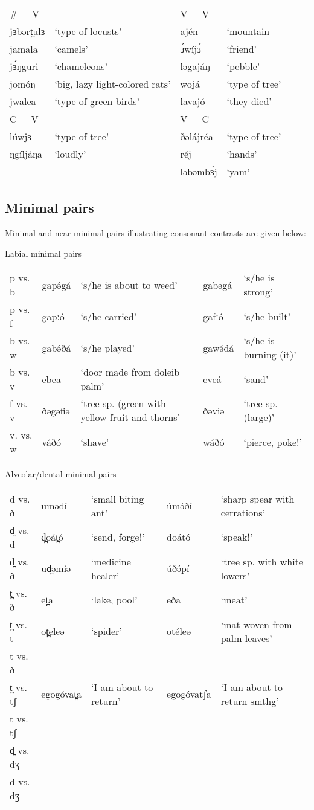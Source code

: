 \ea 
\begin{tabular}[t]{lp{3cm}lp{3cm}}
\#\_\_V	&&	V\_\_V		\\
jɜbərt̪ulɜ	&‘type of locusts’	&ajén	&‘mountain\\
jamala		&‘camels’			&ɜ́wíjɜ́	&‘friend’\\
jɜ́ŋguri		&‘chameleons’		&ləgajáŋ	&‘pebble’\\
jomóŋ		&‘big, lazy light-colored rats’		&wojá	&‘type of tree’\\
jwalea 		&‘type of green birds’		&lavajó	&‘they died’\\
\midrule
C\_\_V	&&		V\_\_C	\\
\midrule
lúwjɜ		&‘type of tree’		&ðəlájréa	&‘type of tree’\\
ŋgíljáŋa	&‘loudly’		&réj				&‘hands’\\
							&&ləbəmbɜ́j		&‘yam’
\end{tabular}\label{ex:ch2:42}	
\z



\subsection{Minimal pairs}
Minimal and near minimal pairs illustrating consonant contrasts are given below:

\ea Labial minimal pairs
\begin{tabular}[t]{llp{3cm}ll}
p vs. b	& gapə́gá		&‘s/he is about to weed’			&gabəgá	&‘s/he is strong’\\
p vs. f	&gapːó		&‘s/he carried’					&gafːó	&‘s/he built’\\
b vs. w	&gabə́ðá		&‘s/he played’					&gawə́dá	&‘s/he is burning (it)’\\
b vs. v	&ebea		&‘door made from doleib palm’	&eveá	&‘sand’\\
f vs. v	&ðəgəfiə	&‘tree sp. (green with yellow fruit and thorns’	&ðəviə	&‘tree sp. (large)’\\
v. vs. w	&váðó	&‘shave’							&wáðó	&‘pierce, poke!’
\end{tabular}\label{ex:ch2:43}
\z 


\ea Alveolar/dental minimal pairs
\begin{tabular}[t]{llp{3cm}lp{3cm}}
d vs. ð	&umədí	&‘small biting ant’	&úmə́ðí	&‘sharp spear with cerrations’\\
d̪ vs. d	&d̪oát̪ó	&‘send, forge!’		&doátó	&‘speak!’\\
d̪ vs. ð	&ud̪əmiə	&‘medicine healer’	&úðə́pí	&‘tree sp. with white lowers’\\
t̪ vs. ð	&et̪a	&‘lake, pool’		&eða		&‘meat’\\
t̪ vs. t	&ot̪eleə	&‘spider’			&otéleə	&‘mat woven from palm leaves’\\
t vs. ð				\\
t̪ vs. tʃ&egogóvat̪a	&‘I am about to return’	&egogóvatʃa	&‘I am about to return smthg’\\
t vs. tʃ	\\			
d̪ vs. dʒ		\\		
d vs. dʒ	
\end{tabular}\label{ex:ch2:44}
\z 

